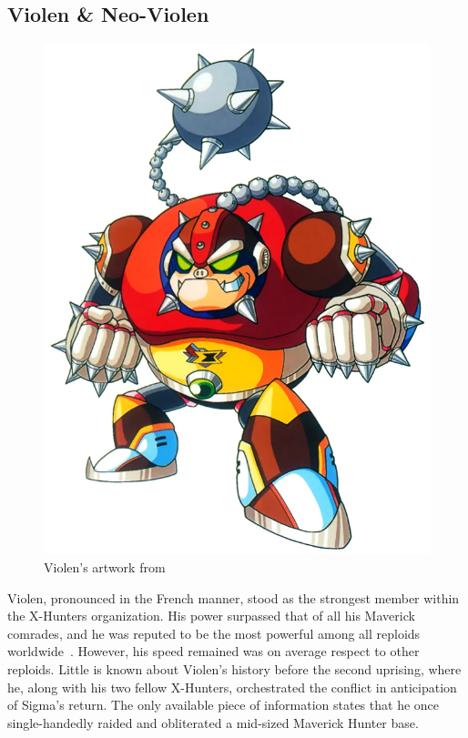 \subsection{Violen \& Neo-Violen}\label{boss:Neo-Violen}
\begin{figure}[htp]
	\centering
	\includegraphics[height=\portraitsize]{figures/X2/Hunter_stages/Violen.png}
	\caption{Violen's artwork from \cite{book:MMX_Complete_art}}
\end{figure}
Violen, pronounced in the French manner, stood as the strongest member within the X-Hunters organization. His power surpassed that of all his Maverick comrades, and he was reputed to be the most powerful among all reploids worldwide~\cite{wayback:X2_resources}. However, his speed remained was on average respect to other reploids. Little is known about Violen's history before the second uprising, where he, along with his two fellow X-Hunters, orchestrated the conflict in anticipation of Sigma's return. The only available piece of information states that he once single-handedly raided and obliterated a mid-sized Maverick Hunter base.

